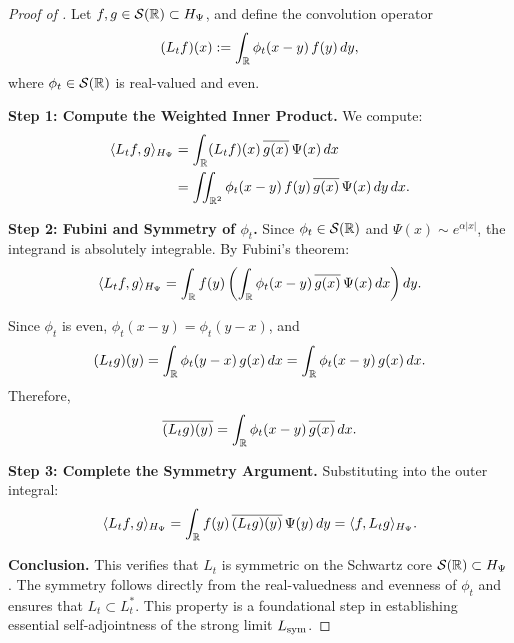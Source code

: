 \begin{proof}[Proof of ]
Let \( f, g \in \mathcal{S}(\mathbb{R}) \subset H_\Psi \), and define the convolution operator
\[
(L_t f)(x) := \int_{\mathbb{R}} \phi_t(x - y)\, f(y)\, dy,
\]
where \( \phi_t \in \mathcal{S}(\mathbb{R}) \) is real-valued and even.

\medskip
\noindent\textbf{Step 1: Compute the Weighted Inner Product.}
We compute:
\[
\begin{aligned}
\langle L_t f, g \rangle_{H_\Psi}
&= \int_{\mathbb{R}} (L_t f)(x)\, \overline{g(x)}\, \Psi(x)\, dx \\
&= \iint_{\mathbb{R}^2} \phi_t(x - y)\, f(y)\, \overline{g(x)}\, \Psi(x)\, dy\, dx.
\end{aligned}
\]

\medskip
\noindent\textbf{Step 2: Fubini and Symmetry of \( \phi_t \).}
Since \( \phi_t \in \mathcal{S}(\mathbb{R}) \) and \( \Psi(x) \sim e^{\alpha |x|} \), the integrand is absolutely integrable. By Fubini’s theorem:
\[
\langle L_t f, g \rangle_{H_\Psi}
= \int_{\mathbb{R}} f(y) \left( \int_{\mathbb{R}} \phi_t(x - y)\, \overline{g(x)}\, \Psi(x)\, dx \right) dy.
\]

Since \( \phi_t \) is even, \( \phi_t(x - y) = \phi_t(y - x) \), and
\[
(L_t g)(y) = \int_{\mathbb{R}} \phi_t(y - x)\, g(x)\, dx = \int_{\mathbb{R}} \phi_t(x - y)\, g(x)\, dx.
\]
Therefore,
\[
\overline{(L_t g)(y)} = \int_{\mathbb{R}} \phi_t(x - y)\, \overline{g(x)}\, dx.
\]

\medskip
\noindent\textbf{Step 3: Complete the Symmetry Argument.}
Substituting into the outer integral:
\[
\langle L_t f, g \rangle_{H_\Psi}
= \int_{\mathbb{R}} f(y)\, \overline{(L_t g)(y)}\, \Psi(y)\, dy = \langle f, L_t g \rangle_{H_\Psi}.
\]

\medskip
\noindent\textbf{Conclusion.}
This verifies that \( L_t \) is symmetric on the Schwartz core \( \mathcal{S}(\mathbb{R}) \subset H_\Psi \). The symmetry follows directly from the real-valuedness and evenness of \( \phi_t \) and ensures that \( L_t \subset L_t^* \). This property is a foundational step in establishing essential self-adjointness of the strong limit \( L_{\mathrm{sym}} \).
\end{proof}

